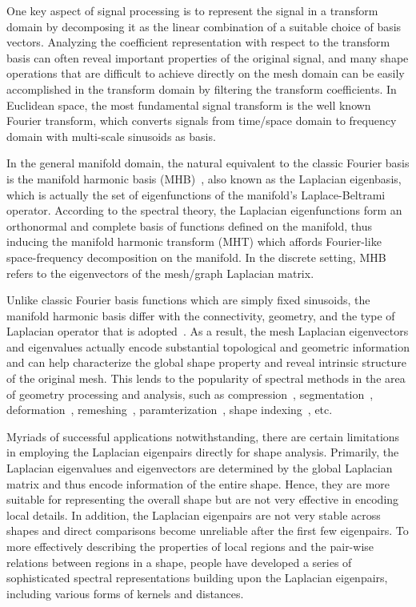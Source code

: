 One key aspect of signal processing is to represent the signal in a transform
domain by decomposing it as the linear combination of a suitable choice of basis
vectors. Analyzing the coefficient representation with respect to the transform 
basis can often reveal important properties of the original signal, and many
shape operations that are difficult to achieve directly on the mesh domain 
can be easily accomplished in the transform domain by filtering the 
transform coefficients. In Euclidean space, the most fundamental signal transform 
is the well known Fourier transform, which converts signals from time/space domain to 
frequency domain with multi-scale sinusoids as basis.  

In the general manifold domain, the natural equivalent to the classic Fourier basis is
the manifold harmonic basis (MHB)~\cite{Vallet2008}, also known as the Laplacian eigenbasis, 
which is actually the set of eigenfunctions of the manifold's Laplace-Beltrami operator.
According to the spectral theory, the Laplacian eigenfunctions form an orthonormal and complete
basis of functions defined on the manifold, thus inducing the manifold harmonic transform (MHT) 
which affords Fourier-like space-frequency decomposition on the manifold. In the discrete setting, 
MHB refers to the eigenvectors of the mesh/graph Laplacian matrix. 

Unlike classic Fourier basis functions which are simply fixed sinusoids, the manifold harmonic basis 
differ with the connectivity, geometry, and the type of Laplacian operator that is adopted~\cite{Zhang:2010:CGF}. 
As a result, the mesh Laplacian eigenvectors and eigenvalues actually encode substantial topological and
geometric information and can help characterize the global shape property and reveal intrinsic structure of the 
original mesh. This lends to the popularity of spectral methods in 
the area of geometry processing and analysis, such as compression~\cite{Karni2000}, 
segmentation~\cite{Liu2007}, deformation~\cite{Rong2008}, remeshing~\cite{dong2006spectral},
paramterization~\cite{Zhou2004}, shape indexing~\cite{Reuter:2006:CAD, Rustamov:2007:LEF}, etc. 

Myriads of successful applications notwithstanding, there are certain limitations in employing the Laplacian
eigenpairs directly for shape analysis. Primarily, the Laplacian eigenvalues and eigenvectors are determined 
by the global Laplacian matrix and thus encode information of the entire shape. Hence, they are more suitable
for representing the overall shape but are not very effective in encoding local details. In addition, the Laplacian
eigenpairs are not very stable across shapes and direct comparisons become unreliable after the first few eigenpairs.
To more effectively describing the properties of local regions and the pair-wise relations between regions 
in a shape, people have developed a series of sophisticated spectral representations building upon the 
Laplacian eigenpairs, including various forms of kernels and distances.

